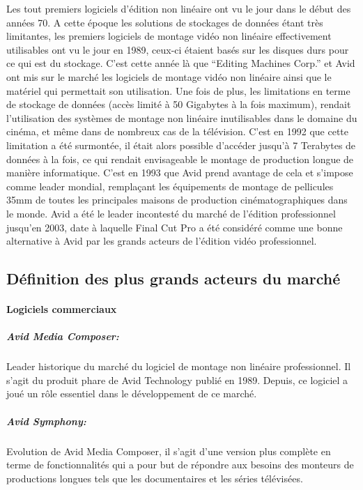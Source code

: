 Les tout premiers logiciels d'édition non linéaire ont vu le jour dans
le début des années 70.  A cette époque les solutions de stockages
de données étant très limitantes, les premiers logiciels de montage
vidéo non linéaire effectivement utilisables ont vu le jour en
1989, ceux-ci étaient basés sur les disques durs pour ce qui est du
stockage. C'est cette année là que ``Editing Machines Corp.'' et Avid
ont mis sur le marché les logiciels de montage vidéo non linéaire
ainsi que le matériel qui permettait son utilisation. Une fois de plus,
les limitations en terme de stockage de données (accès limité à
50 Gigabytes à la fois maximum), rendait l'utilisation des systèmes
de montage non linéaire inutilisables dans le domaine du cinéma,
et même dans de nombreux cas de la télévision. C'est en 1992 que
cette limitation a été surmontée, il était alors possible d'accéder
jusqu'à 7 Terabytes de données à la fois, ce qui rendait envisageable
le montage de production longue de manière informatique. C'est en
1993 que Avid prend avantage de cela et s'impose comme leader mondial,
remplaçant les équipements de montage de pellicules 35mm de toutes
les principales maisons de production cinématographiques dans le
monde. Avid a été le leader incontesté du marché de l'édition
professionnel jusqu'en 2003, date à laquelle Final Cut Pro a été
considéré comme une bonne alternative à Avid par les grands acteurs
de l'édition vidéo professionnel.

\subsection{Définition des plus grands acteurs du marché}

\paragraph {Logiciels commerciaux}

\subparagraph{Avid Media Composer:}

Leader historique du marché du logiciel de montage non linéaire
professionnel. Il s'agit du produit phare de Avid Technology publié
en 1989. Depuis, ce logiciel a joué un rôle essentiel dans le
développement de ce marché.

\subparagraph{Avid Symphony:}

Evolution de Avid Media Composer, il s'agit d'une version plus complète
en terme de fonctionnalités qui a pour but de répondre aux besoins
des monteurs de productions longues tels que les documentaires et les
séries télévisées.

